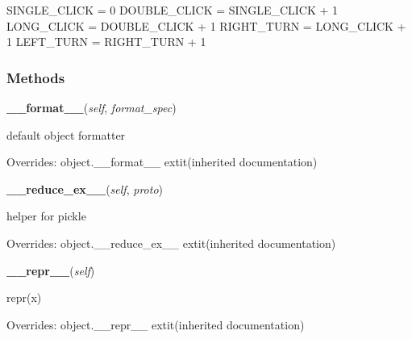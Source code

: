 SINGLE\_CLICK = 0 DOUBLE\_CLICK = SINGLE\_CLICK + 1 LONG\_CLICK = 
DOUBLE\_CLICK + 1 RIGHT\_TURN = LONG\_CLICK + 1 LEFT\_TURN = RIGHT\_TURN + 
1



  \subsubsection{Methods}

    \vspace{0.5ex}

\hspace{.8\funcindent}\begin{boxedminipage}{\funcwidth}

    \raggedright \textbf{\_\_format\_\_}(\textit{self}, \textit{format\_spec})

\setlength{\parskip}{2ex}
    default object formatter

\setlength{\parskip}{1ex}
      Overrides: object.\_\_format\_\_ 	extit{(inherited documentation)}

    \end{boxedminipage}

    \vspace{0.5ex}

\hspace{.8\funcindent}\begin{boxedminipage}{\funcwidth}

    \raggedright \textbf{\_\_reduce\_ex\_\_}(\textit{self}, \textit{proto})

\setlength{\parskip}{2ex}
    helper for pickle

\setlength{\parskip}{1ex}
      Overrides: object.\_\_reduce\_ex\_\_ 	extit{(inherited documentation)}

    \end{boxedminipage}

    \vspace{0.5ex}

\hspace{.8\funcindent}\begin{boxedminipage}{\funcwidth}

    \raggedright \textbf{\_\_repr\_\_}(\textit{self})

\setlength{\parskip}{2ex}
    repr(x)

\setlength{\parskip}{1ex}
      Overrides: object.\_\_repr\_\_ 	extit{(inherited documentation)}

    \end{boxedminipage}

